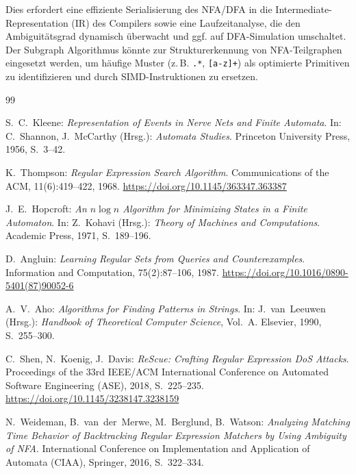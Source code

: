 ﻿\documentclass[a4paper,12pt]{article}
\theoremstyle{definition}
\begin{document}
Dies erfordert eine effiziente Serialisierung des NFA/DFA in die
Intermediate-Representation (IR) des Compilers sowie eine Laufzeitanalyse,
die den Ambiguitätsgrad dynamisch überwacht und ggf. auf DFA-Simulation
umschaltet. Der Subgraph Algorithmus könnte zur Strukturerkennung von
NFA-Teilgraphen eingesetzt werden, um häufige Muster (z.\,B. \texttt{.*},
\texttt{[a-z]+}) als optimierte Primitiven zu identifizieren und durch
SIMD-Instruktionen zu ersetzen.

\begin{thebibliography}{99}

S.~C.~Kleene:
\textit{Representation of Events in Nerve Nets and Finite Automata}.
In: C.~Shannon, J.~McCarthy (Hrsg.): \textit{Automata Studies}.
Princeton University Press, 1956, S.~3--42.

K.~Thompson:
\textit{Regular Expression Search Algorithm}.
Communications of the ACM, 11(6):419--422, 1968.
\url{https://doi.org/10.1145/363347.363387}

J.~E.~Hopcroft:
\textit{An $n \log n$ Algorithm for Minimizing States in a Finite Automaton}.
In: Z.~Kohavi (Hrsg.): \textit{Theory of Machines and Computations}.
Academic Press, 1971, S.~189--196.

D.~Angluin:
\textit{Learning Regular Sets from Queries and Counterexamples}.
Information and Computation, 75(2):87--106, 1987.
\url{https://doi.org/10.1016/0890-5401(87)90052-6}

A.~V.~Aho:
\textit{Algorithms for Finding Patterns in Strings}.
In: J.~van~Leeuwen (Hrsg.): \textit{Handbook of Theoretical Computer Science},
Vol.~A. Elsevier, 1990, S.~255--300.

C.~Shen, N.~Koenig, J.~Davis:
\textit{ReScue: Crafting Regular Expression DoS Attacks}.
Proceedings of the 33rd IEEE/ACM International Conference on Automated
Software Engineering (ASE), 2018, S.~225--235.
\url{https://doi.org/10.1145/3238147.3238159}

N.~Weideman, B.~van~der~Merwe, M.~Berglund, B.~Watson:
\textit{Analyzing Matching Time Behavior of Backtracking Regular Expression Matchers
by Using Ambiguity of NFA}.
International Conference on Implementation and Application of Automata (CIAA),
Springer, 2016, S.~322--334.


\end{thebibliography}
\end{document}
